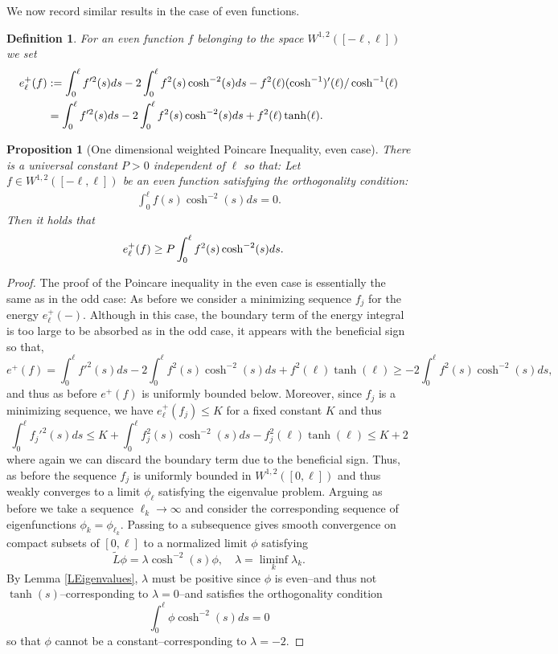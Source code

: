 \documentclass{amsart}
\newtheorem{proposition}{Proposition}
\newtheorem{definition}{Definition}
\newcommand{\wt}{\widetilde}
\begin{document}
We now record similar results in the case of even functions. 
\begin{definition} \label{Dim1EnergyEven}
For an even function  $f$ belonging to the space $W^{1, 2} ([-\ell, \ell])$ we set
 \begin{align} \notag
 e^{+}_\ell (f) & : = \int_{0}^\ell f'^2 (s) ds - 2 \int_0^\ell f^2(s) \cosh^{-2} (s) ds - f^2 (\ell) (\cosh^{-1})'(\ell)/\cosh^{-1}(\ell) \\
 & =  \int_{0}^\ell f'^2 (s) ds - 2 \int_0^\ell f^2(s) \cosh^{-2} (s) ds + f^2 (\ell) \tanh(\ell).
 \end{align}
 \end{definition}

\begin{proposition}[One dimensional weighted Poincare Inequality, even case] \label{PoincareInequalityEven}
There is a universal constant  $P > 0$ independent of $\ell$ so that: Let $f \in W^{1, 2}([-\ell, \ell])$  be an even function satisfying the orthogonality condition:
\begin{align} \label{WeightedOrthogonalityConditionEven}
\int_0^\ell f (s)\cosh^{-2}(s) ds = 0.
\end{align}
Then it holds that 
\begin{align} \notag
e^{+}_\ell(f) & \geq P \int_{0}^\ell f^2(s) \cosh^{-2}(s) ds.
\end{align}
\end{proposition}

\begin{proof}
The proof of the Poincare inequality in the even case is essentially the same as in the odd case:  As before we consider a minimizing sequence $f_j$ for the energy $e^+_{\ell}(-)$. Although in this case, the boundary term  of the energy integral is too large to be absorbed as in the odd case, it appears with the beneficial sign so that, 
\[
e^+(f) = \int_{0}^\ell f'^2 (s) ds - 2 \int_0^\ell f^2(s) \cosh^{-2} (s) ds + f^2 (\ell) \tanh(\ell) \geq - 2 \int_0^\ell f^2(s) \cosh^{-2} (s) ds,
\]
and thus as before $e^+(f)$ is uniformly bounded below. Moreover, since $f_j$ is a minimizing sequence, we have $e^+_\ell(f_j) \leq K$ for a fixed constant $K$ and thus
\[
\int_{0}^\ell f_j'^{2}(s)ds \leq K +  \int_{0}^\ell f_j^2(s)\cosh^{-2}(s)ds -f_j^2 (\ell) \tanh(\ell) \leq K + 2
\]
where again we can discard the boundary term due to the beneficial sign.  Thus, as before the sequence $f_j$ is uniformly bounded in $W^{1, 2}([0, \ell])$ and thus weakly converges to a limit $\phi_\ell$ satisfying the eigenvalue problem.  Arguing as before we take a sequence $\ell_k \rightarrow \infty$ and consider the corresponding sequence of eigenfunctions $\phi_k = \phi_{\ell_k}$. Passing to a subsequence gives smooth convergence  on compact subsets of $[0, \ell]$ to a normalized limit  $\phi$ satisfying
\[
\wt{L} \phi = \lambda \cosh^{-2}(s) \phi, \quad \lambda = \liminf_k \lambda_k.
\]
By Lemma \ref{LEigenvalues}, $\lambda$ must be positive since $\phi$ is even--and thus not $\tanh(s)$--corresponding to $\lambda = 0$--and satisfies the orthogonality condition 
\[
\int_{0}^\ell \phi\cosh^{-2}(s)ds = 0
\]
so that $\phi$ cannot be a constant--corresponding to $\lambda = -2$.
 \end{proof}
 
\end{document}
